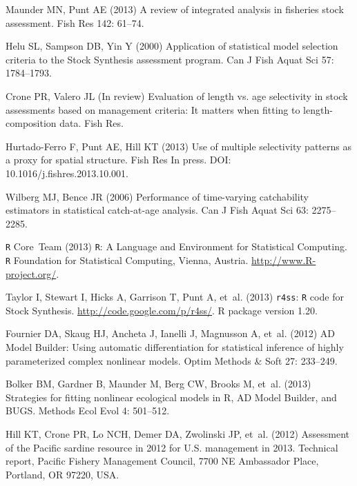 \documentclass[11pt]{article}
\begin{document}
\begin{thebibliography}{10}
Maunder MN, Punt AE (2013) A review of integrated analysis in fisheries stock
  assessment.
\newblock Fish Res 142: 61--74.

Helu SL, Sampson DB, Yin Y (2000) Application of statistical model selection
  criteria to the {Stock Synthesis} assessment program.
\newblock Can J Fish Aquat Sci 57: 1784--1793.

Crone PR, Valero JL (In review) Evaluation of length vs. age selectivity in
  stock assessments based on management criteria: It matters when fitting to
  length-composition data.
\newblock Fish Res.

Hurtado-Ferro F, Punt AE, Hill KT (2013) Use of multiple selectivity patterns
  as a proxy for spatial structure.
\newblock Fish Res In press. DOI: 10.1016/j.fishres.2013.10.001.

Wilberg MJ, Bence JR (2006) Performance of time-varying catchability estimators
  in statistical catch-at-age analysis.
\newblock Can J Fish Aquat Sci 63: 2275--2285.

\texttt{R} Core~Team (2013) \texttt{R}: A Language and Environment for
  Statistical Computing.
\newblock \texttt{R} Foundation for Statistical Computing, Vienna, Austria.
\newblock \urlprefix\url{http://www.R-project.org/}.

Taylor I, Stewart I, Hicks A, Garrison T, Punt A, et~al. (2013) \texttt{r4ss}:
  \texttt{R} code for Stock Synthesis.
\newblock \urlprefix\url{http://code.google.com/p/r4ss/}.
\newblock R package version 1.20.

Fournier DA, Skaug HJ, Ancheta J, Ianelli J, Magnusson A, et~al. (2012) {AD
  Model Builder}: Using automatic differentiation for statistical inference of
  highly parameterized complex nonlinear models.
\newblock Optim Methods \& Soft 27: 233--249.

Bolker BM, Gardner B, Maunder M, Berg CW, Brooks M, et~al. (2013) Strategies
  for fitting nonlinear ecological models in {R}, {AD Model Builder}, and
  {BUGS}.
\newblock Methods Ecol Evol 4: 501--512.

Hill KT, Crone PR, Lo NCH, Demer DA, Zwolinski JP, et~al. (2012) Assessment of
  the {Pacific} sardine resource in 2012 for {U.S.} management in 2013.
\newblock Technical report, Pacific Fishery Management Council, 7700 NE
  Ambassador Place, Portland, OR 97220, USA.


\end{thebibliography}
\end{document}
